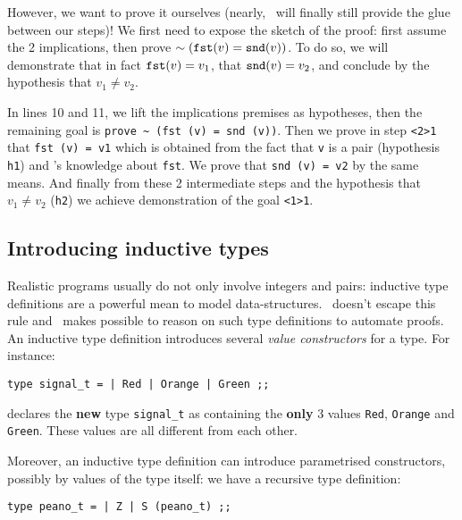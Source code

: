 \documentclass[11pt,a4paper,twoside,onecolumn,fullpage]{article}
\begin{document}
{\scriptsize
}

However, we want to prove it ourselves (nearly, \zenon\ will finally still
provide the glue between our steps)! We first need to expose
the sketch of the proof: first assume the 2 implications, then prove
$\sim ({\tt fst} (v) = {\tt snd} (v))$. To do so, we will demonstrate that in fact
${\tt fst} (v) = v_1$, that ${\tt snd} (v) = v_2$, and conclude by the hypothesis
that $v_1 \not = v_2$.

{\scriptsize
}

In lines 10 and 11, we lift the implications premises as hypotheses,
then the re\-mai\-ning goal is \lstinline"prove ~ (fst (v) = snd (v))".
Then we prove in step \lstinline"<2>1" that \lstinline"fst (v) = v1"
which is obtained from the fact that \lstinline"v" is a pair (hypothesis
\lstinline"h1") and \zenon's knowledge about \lstinline"fst". We prove
that \lstinline"snd (v) = v2" by the same means. And finally from
these 2 intermediate steps and the hypothesis that $v_1 \not = v_2$
(\lstinline"h2") we achieve demonstration of the goal \lstinline"<1>1".


\subsection{Introducing inductive types}

Realistic programs usually do not only involve integers and pairs:
inductive type de\-fi\-ni\-tions are a powerful mean to model
data-structures. \focal\ doesn't escape this rule and \zenon\ makes
possible to reason on such type definitions to automate
proofs.
An inductive type definition introduces several {\em value constructors} for a type.
For instance:

{\scriptsize
\begin{lstlisting}
type signal_t = | Red | Orange | Green ;;
\end{lstlisting}}

\noindent declares the {\bf new} type \lstinline"signal_t" as containing the
{\bf only} 3 values \lstinline"Red", \lstinline"Orange" and
\lstinline"Green". These values are all different from each other.

Moreover, an inductive type definition can introduce parametrised
constructors, possibly by values of the type itself: we have a recursive
type definition:

{\scriptsize
\begin{lstlisting}
type peano_t = | Z | S (peano_t) ;;
\end{lstlisting}}
\end{document}
